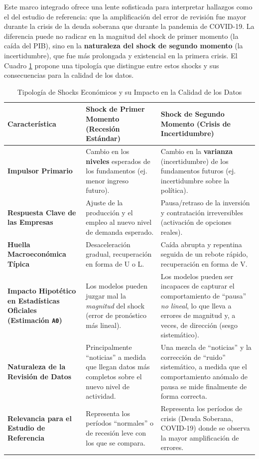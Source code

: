 \documentclass{article}
\begin{document}
Este marco integrado ofrece una lente sofisticada para interpretar hallazgos como el del estudio de referencia: que la amplificación del error de revisión fue mayor durante la crisis de la deuda soberana que durante la pandemia de COVID-19. La diferencia puede no radicar en la magnitud del shock de primer momento (la caída del PIB), sino en la \textbf{naturaleza del shock de segundo momento} (la incertidumbre), que fue más prolongada y existencial en la primera crisis. El Cuadro \ref{tab:tipologia_shocks} propone una tipología que distingue entre estos shocks y sus consecuencias para la calidad de los datos.

\begin{table}[h!]
\centering
\caption{Tipología de Shocks Económicos y su Impacto en la Calidad de los Datos}
\label{tab:tipologia_shocks}
\begin{tabularx}{\textwidth}{|l|X|X|}
\hline
\textbf{Característica} & \textbf{Shock de Primer Momento (Recesión Estándar)} & \textbf{Shock de Segundo Momento (Crisis de Incertidumbre)} \\
\hline
\textbf{Impulsor Primario} & Cambio en los \textbf{niveles} esperados de los fundamentos (ej. menor ingreso futuro). & Cambio en la \textbf{varianza} (incertidumbre) de los fundamentos futuros (ej. incertidumbre sobre la política). \\
\hline
\textbf{Respuesta Clave de las Empresas} & Ajuste de la producción y el empleo al nuevo nivel de demanda esperado. & Pausa/retraso de la inversión y contratación irreversibles (activación de opciones reales). \\
\hline
\textbf{Huella Macroeconómica Típica} & Desaceleración gradual, recuperación en forma de U o L. & Caída abrupta y repentina seguida de un rebote rápido, recuperación en forma de V. \\
\hline
\textbf{Impacto Hipotético en Estadísticas Oficiales (Estimación \texttt{A0})} & Los modelos pueden juzgar mal la \textit{magnitud} del shock (error de pronóstico más lineal). & Los modelos pueden ser incapaces de capturar el comportamiento de ``pausa'' \textit{no lineal}, lo que lleva a errores de magnitud y, a veces, de dirección (sesgo sistemático). \\
\hline
\textbf{Naturaleza de la Revisión de Datos} & Principalmente ``noticias'' a medida que llegan datos más completos sobre el nuevo nivel de actividad. & Una mezcla de ``noticias'' y la corrección de ``ruido'' sistemático, a medida que el comportamiento anómalo de pausa se mide finalmente de forma correcta. \\
\hline
\textbf{Relevancia para el Estudio de Referencia} & Representa los períodos ``normales'' o de recesión leve con los que se compara. & Representa los períodos de crisis (Deuda Soberana, COVID-19) donde se observa la mayor amplificación de errores. \\
\hline
\end{tabularx}
\end{table}
\end{document}
